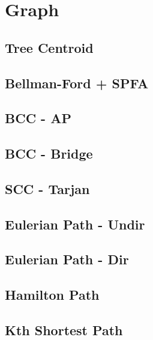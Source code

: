 \documentclass[a4paper,10pt,twocolumn,oneside]{article}
\begin{document}
\section{Graph}

\subsection{Tree Centroid}


\subsection{Bellman-Ford + SPFA}


\subsection{BCC - AP}


\subsection{BCC - Bridge}


\subsection{SCC - Tarjan}


\subsection{Eulerian Path - Undir}


\subsection{Eulerian Path - Dir}


\subsection{Hamilton Path}


\subsection{Kth Shortest Path}

\end{document}
